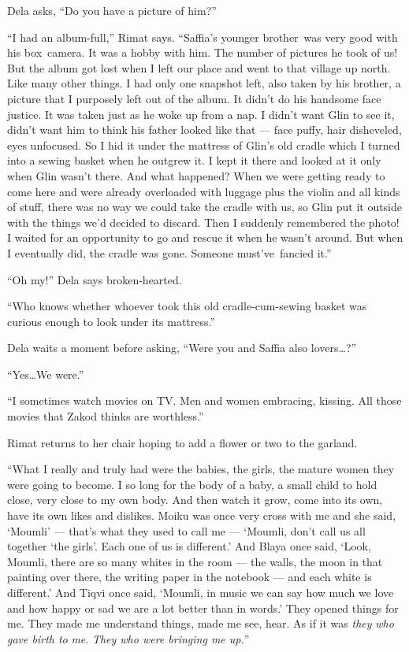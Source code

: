 \documentclass[twoside,11pt]{book}
\begin{document}
Dela asks, ``Do you have a picture of him?''

``I had an album-full,'' Rimat says. ``Saffia's younger brother~was very good
with his box~camera. It was a hobby with him.  The number of pictures he took of us! But the album got lost when I left
our place and went to that village up north. Like many other things. I had only one snapshot left, also taken by his
brother, a picture that I purposely left out of the album. It didn't do his handsome face justice. It was taken just as
he woke up from a nap. I didn't want Glin to see it, didn't want him to think his father looked like that --- face
puffy, hair disheveled, eyes unfocused. So I hid it under the mattress of Glin's old cradle which I turned into a
sewing basket when he outgrew it. I kept it there and looked at it only when Glin wasn't there. And what happened? When
we were getting ready to come here and were already overloaded with luggage plus the violin and all kinds of stuff,
there was no way we could take the cradle with us, so Glin put it outside with the things we'd decided to discard. Then
I suddenly remembered the photo! I waited for an opportunity to go and rescue it when he wasn't around. But when I
eventually did, the cradle was gone. Someone must've~fancied it.''

``Oh my!''  Dela says broken-hearted.

``Who knows whether whoever took this old cradle-cum-sewing basket was curious enough to look under its
mattress.''

Dela waits a moment before asking, ``Were you and Saffia also lovers{\ldots}?''

``Yes{\ldots}We were.''

``I sometimes watch movies on TV. Men and women embracing, kissing. All those movies that Zakod thinks are
worthless.''

Rimat returns to her chair hoping to add a flower or two to the garland.

``What I really and truly had were the babies, the girls, the mature women they were going to become. I so
long for the body of a baby, a small child to hold close, very close to my own body. And then watch it grow, come into
its own, have its own likes and dislikes. Moiku was once very cross with me and she said, `Moumli' --- that's what
they used to call me --- `Moumli, don't call us all together `the girls'. Each one of us is different.'   And Blaya
once said, `Look, Moumli, there are so many whites in the room --- the walls, the moon in that painting over there, the
writing paper in the notebook --- and each white is different.' And Tiqvi once said, `Moumli, in music we can say how
much we love and how happy or sad we are a lot better than in words.' They opened things for me. They made me
understand things, made me see, hear. As if it was \textit{they} \textit{who gave birth to} \textit{me}.\textit{ They
who were bringing me up.}''
\end{document}
